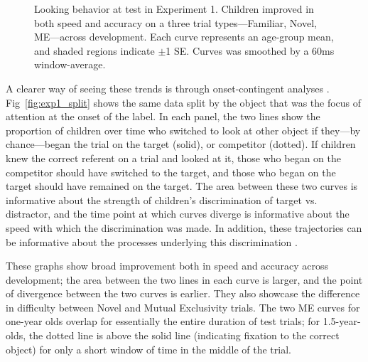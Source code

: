\documentclass[man,floatsintext]{apa6}
\begin{document}
\begin{figure}[tb]
	\caption{\label{fig:exp1_test_spaghetti}Looking behavior at test in Experiment 1. Children improved in both speed and accuracy on a three trial types---Familiar, Novel, ME---across development. Each curve represents an age-group mean, and shaded regions indicate $\pm$1 SE. Curves was smoothed by a 60ms window-average.}
\end{figure}

A clearer way of seeing these trends is through onset-contingent analyses \cite{fernald2008}. Fig~\ref{fig:exp1_split} shows the same data split by the object that was the focus of attention at the onset of the label. In each panel, the two lines show the proportion of children over time who switched to look at other object if they---by chance---began the trial on the target (solid), or competitor (dotted). If children knew the correct referent on a trial and looked at it, those who began on the competitor should have switched to the target, and those who began on the target should have remained on the target. The area between these two curves is informative about the strength of children's discrimination of target vs. distractor, and the time point at which curves diverge is informative about the speed with which the discrimination was made. In addition, these trajectories can be informative about the processes underlying this discrimination \cite{Halberda2006}. 

These graphs show broad improvement both in speed and accuracy across development; the area between the two lines in each curve is larger, and the point of divergence between the two curves is earlier. They also showcase the difference in difficulty between Novel and Mutual Exclusivity trials. The two ME curves for one-year olds overlap for essentially the entire duration of test trials; for 1.5-year-olds, the dotted line is above the solid line (indicating fixation to the correct object) for only a short window of time in the middle of the trial. 
\end{document}
